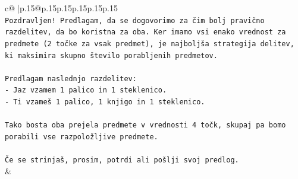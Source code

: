 \documentclass{article}
\begin{document}
{\begin{supertabular}{c@{$\;$}|p{.15\linewidth}@{}p{.15\linewidth}p{.15\linewidth}p{.15\linewidth}p{.15\linewidth}p{.15\linewidth}}
{{{\\ 
\texttt{Pozdravljen! Predlagam, da se dogovorimo za čim bolj pravično razdelitev, da bo koristna za oba. Ker imamo vsi enako vrednost za predmete (2 točke za vsak predmet), je najboljša strategija delitev, ki maksimira skupno število porabljenih predmetov.} \\
\\ 
\texttt{Predlagam naslednjo razdelitev:} \\
\texttt{{-} Jaz vzamem 1 palico in 1 steklenico.} \\
\texttt{{-} Ti vzameš 1 palico, 1 knjigo in 1 steklenico.} \\
\\ 
\texttt{Tako bosta oba prejela predmete v vrednosti 4 točk, skupaj pa bomo porabili vse razpoložljive predmete.} \\
\\ 
\texttt{Če se strinjaš, prosim, potrdi ali pošlji svoj predlog.} \\
            }
        }
    }
    & \\ \\


\end{supertabular}}
\end{document}
